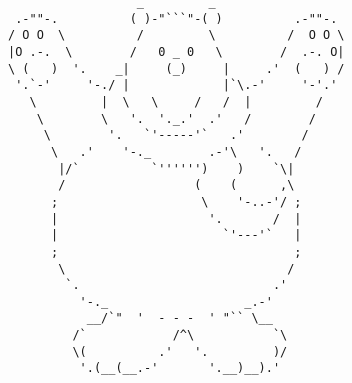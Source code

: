 \documentclass{article}
\begin{document}
\vfill
\centering
\scriptsize
\begin{BVerbatim}
                  _         _
 .-""-.          ( )-"```"-( )          .-""-.
/ O O  \          /         \          /  O O \
|O .-.  \        /   0 _ 0   \        /  .-. O|
\ (   )  '.    _|     (_)     |     .'  (   ) /
 '.`-'     '-./ |             |`\.-'     '-'.'
   \         |  \   \     /   /  |         /
    \        \   '.  '._.'  .'   /        /
     \        '.   `'-----'`   .'        /
      \   .'    '-._        .-'\   '.   /
       |/`          `'''''')    )    `\|
       /                  (    (      ,\
      ;                    \    '-..-'/ ;
      |                     '.       /  |
      |                       `'---'`   |
      ;                                 ;
       \                               /
        `.                           .'
          '-._                   _.-'
           __/`"  '  - - -  ' "`` \__
         /`            /^\           `\
         \(          .'   '.         )/
          '.(__(__.-'       '.__)__).'
\end{BVerbatim}
\end{document}

